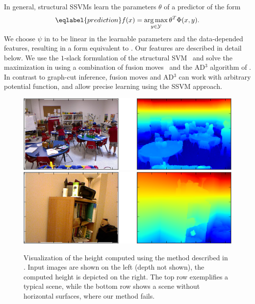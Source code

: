 In general, structural SSVMs learn the parameters $\theta$ of a predictor of the form
\begin{equation}\eqlabel{prediction}
f(x) = \argmax_{y \in \mathcal{Y}} \theta^T \Phi(x, y).
\end{equation}
We choose $\psi$ in  to be linear in the learnable parameters and
the data-depended features, resulting in a form equivalent to
. Our features are described in detail below.  We use the
$1$-slack formulation of the structural SVM~\citep{joachims2009cutting} and
solve the maximization in  using a combination of fusion
moves~\citep{lempitsky2010fusion} and the AD$^3$ algorithm of
\citet{martins2011augmented}.  In contrast to graph-cut inference, fusion moves
and AD$^3$ can work with arbitrary potential function, and allow precise
learning using the SSVM approach.

\begin{figure}
    \begin{center}
        \includegraphics[width=\linewidth]{nyu/images/height_success}\\
        \vspace{3mm}
        \includegraphics[width=\linewidth]{nyu/images/height_failure}
    \end{center}
    \caption{%
        Visualization of the height computed using the method described in .
        Input images are shown on the left (depth not shown), the computed height is depicted on the right.
        The top row exemplifies a typical scene, while the bottom row shows a scene without horizontal
        surfaces, where our method fails.
    }
\end{figure}

